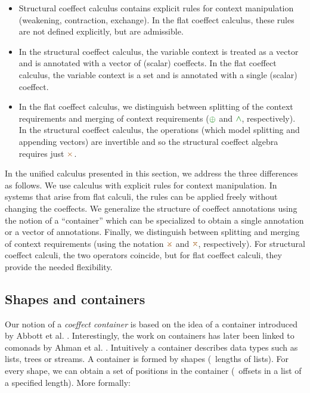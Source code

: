 \begin{itemize}
\item Structural coeffect calculus contains explicit rules for context manipulation
  (weakening, contraction, exchange). In the flat coeffect calculus, these rules are not defined
  explicitly, but are admissible.

\item In the structural coeffect calculus, the variable context is treated as a vector
  and is annotated with a vector of (scalar) coeffects. In the flat coeffect calculus,
  the variable context is a set and is annotated with a single (scalar) coeffect.

\item In the flat coeffect calculus, we distinguish between splitting of the context requirements
  and merging of context requirements ($\cpar$ and $\czip$, respectively). In the structural
  coeffect calculus, the operations (which model splitting and appending vectors) are invertible 
  and so the structural coeffect algebra requires just $\atimes$.
\end{itemize}

\noindent
In the unified calculus presented in this section, we address the three differences as follows.
We use calculus with explicit rules for context manipulation. In systems that arise from flat
calculi, the rules can be applied freely without changing the coeffects. We generalize the 
structure of coeffect annotations using the notion of a ``container'' which can be specialized 
to obtain a single annotation or a vector of annotations. Finally, we distinguish between 
splitting and merging of context requirements (using the notation $\apar$ and $\azip$, 
respectively). For structural coeffect calculi, the two operators coincide, but for flat
coeffect calculi, they provide the needed flexibility.

\subsection{Shapes and containers}

Our notion of a \emph{coeffect container} is based on the idea of a container introduced by 
Abbott et al. \cite{types-containers}. Interestingly, the work on containers has later been linked
to comonads by Ahman et al. \cite{comonads-containers}. Intuitively a container describes data
types such as lists, trees or streams. A container is formed by shapes (\eg~lengths of lists).
For every shape, we can obtain a set of positions in the container (\eg~offsets in a list of a
specified length). More formally:

